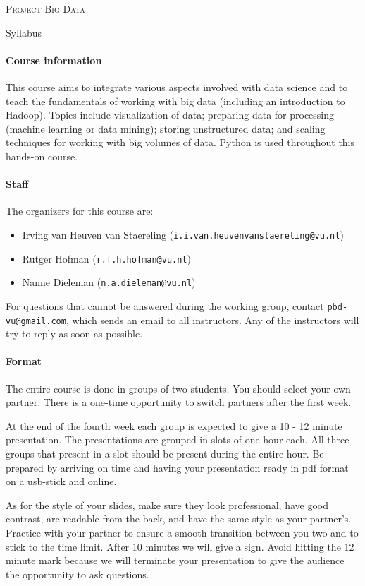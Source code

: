 \documentclass[a4paper]{report}
\newcommand{\blankline}{\par\vspace{5mm}}
\begin{document}
	
\begin{center}
	\textsc{\Large Project Big Data}
	\blankline
	{\large Syllabus}
\end{center}

\hrulefill

\paragraph{Course information}
This course aims to integrate various aspects involved with data science and to teach the fundamentals of working with big data (including an
introduction to Hadoop). Topics include visualization of data; preparing data for processing (machine learning or data mining); storing unstructured data; and scaling techniques for working with big volumes of data. Python is used throughout this hands-on course.

\paragraph{Staff}
The organizers for this course are:
\begin{itemize}
	\setlength\itemsep{0mm}
	\item Irving van Heuven van Staereling (\texttt{i.i.van.heuvenvanstaereling@vu.nl})
	\item Rutger Hofman (\texttt{r.f.h.hofman@vu.nl})
	\item Nanne Dieleman (\texttt{n.a.dieleman@vu.nl})
\end{itemize}
For questions that cannot be answered during the working group, contact \texttt{pbd-vu@gmail.com}, which sends an email to all instructors. Any of the instructors will try to reply as soon as possible.

\paragraph{Format}
The entire course is done in groups of two students. You should select your own partner. There is a one-time opportunity to switch partners after the first week.

At the end of the fourth week each group is expected to give a 10 - 12 minute presentation. The presentations are grouped in slots of one hour each. All three groups that present in a slot should be present during the entire hour. Be prepared by arriving on time and having your presentation ready in pdf format on a usb-stick and online.

As for the style of your slides, make sure they look professional, have good contrast, are readable from the back, and have the same style as your partner’s. Practice with your partner to ensure a smooth transition between you two and to stick to the time limit. After 10 minutes we will give a sign. Avoid hitting the 12 minute mark because we will terminate your presentation to give the audience the opportunity to ask questions.
\end{document}
